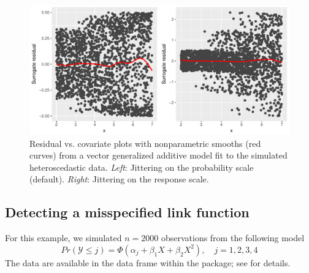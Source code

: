 \begin{figure}[!htbp]
  \centering
  \includegraphics[width=1\textwidth]{heteroscedasticity2}
  \caption{Residual vs. covariate plots with nonparametric smooths (red curves) from a vector generalized additive model fit to the simulated heteroscedastic data. \textit{Left}: Jittering on the probability scale (default). \textit{Right}: Jittering on the response scale.}
  \label{fig:heteroscedasticity2}
\end{figure}


\subsection{Detecting a misspecified link function}

For this example, we simulated $n = 2000$ observations from the following model
\begin{equation*}
  Pr\left(\mathcal{Y} \le j\right) = \Phi\left(\alpha_j + \beta_1 X + \beta_2 X ^ 2\right), \quad j = 1, 2, 3, 4
\end{equation*}
The data are available in the data frame  within the package; see  for details.

